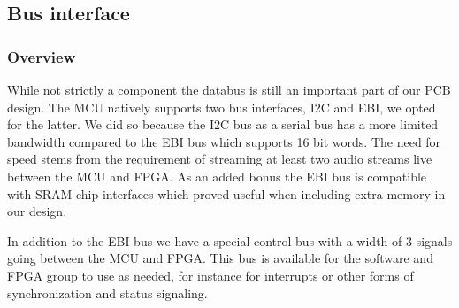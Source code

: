 \subsection{Bus interface}
\subsubsection{Overview}

While not strictly a component the databus is still an important part of
our PCB design. The MCU natively supports two bus interfaces, I2C and EBI,
we opted for the latter. We did so because the I2C bus as a 
serial bus has a more limited bandwidth compared to the EBI bus which 
supports 16 bit words. The need for speed stems from the requirement of
streaming at least two audio streams live between the MCU and FPGA.
As an added bonus the EBI bus is compatible with SRAM chip interfaces 
which proved useful when including extra memory in our design.


In addition to the EBI bus we have a special control bus with a width
of 3 signals going between the MCU and FPGA. This bus is available for the
software and FPGA group to use as needed, for instance for interrupts or
other forms of synchronization and status signaling.